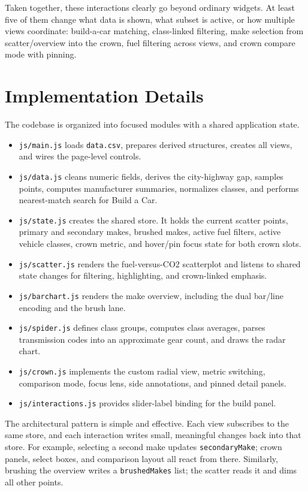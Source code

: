 \documentclass[12pt,letterpaper]{article}
\begin{document}
Taken together, these interactions clearly go beyond ordinary widgets. At least five of them change what data is shown, what subset is active, or how multiple views coordinate: build-a-car matching, class-linked filtering, make selection from scatter/overview into the crown, fuel filtering across views, and crown compare mode with pinning.

\section{Implementation Details}
The codebase is organized into focused modules with a shared application state.

\begin{itemize}
\item \texttt{js/main.js} loads \texttt{data.csv}, prepares derived structures, creates all views, and wires the page-level controls.
\item \texttt{js/data.js} cleans numeric fields, derives the city-highway gap, samples points, computes manufacturer summaries, normalizes classes, and performs nearest-match search for Build a Car.
\item \texttt{js/state.js} creates the shared store. It holds the current scatter points, primary and secondary makes, brushed makes, active fuel filters, active vehicle classes, crown metric, and hover/pin focus state for both crown slots.
\item \texttt{js/scatter.js} renders the fuel-versus-CO2 scatterplot and listens to shared state changes for filtering, highlighting, and crown-linked emphasis.
\item \texttt{js/barchart.js} renders the make overview, including the dual bar/line encoding and the brush lane.
\item \texttt{js/spider.js} defines class groups, computes class averages, parses transmission codes into an approximate gear count, and draws the radar chart.
\item \texttt{js/crown.js} implements the custom radial view, metric switching, comparison mode, focus lens, side annotations, and pinned detail panels.
\item \texttt{js/interactions.js} provides slider-label binding for the build panel.
\end{itemize}

The architectural pattern is simple and effective. Each view subscribes to the same store, and each interaction writes small, meaningful changes back into that store. For example, selecting a second make updates \texttt{secondaryMake}; crown panels, select boxes, and comparison layout all react from there. Similarly, brushing the overview writes a \texttt{brushedMakes} list; the scatter reads it and dims all other points.
\end{document}
